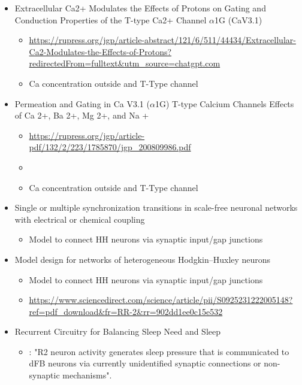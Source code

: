 \documentclass[../workflow.tex]{subfiles}
\begin{document}
\begin{itemize}
    \item Extracellular Ca2+ Modulates the Effects of Protons on Gating and Conduction Properties of the T-type Ca2+ Channel $\alpha$1G (CaV3.1)
    \begin{itemize}
        \item \url{https://rupress.org/jgp/article-abstract/121/6/511/44434/Extracellular-Ca2-Modulates-the-Effects-of-Protons?redirectedFrom=fulltext&utm_source=chatgpt.com}
        \item Ca concentration outside and T-Type channel
    \end{itemize}

    \item Permeation and Gating in Ca V3.1 ($\alpha$1G) T-type Calcium Channels Effects of Ca 2+, Ba 2+, Mg 2+, and Na +
    \begin{itemize}
        \item \url{https://rupress.org/jgp/article-pdf/132/2/223/1785870/jgp_200809986.pdf}
        \item \item Ca concentration outside and T-Type channel
    \end{itemize}

    \item Single or multiple synchronization transitions in scale-free neuronal networks with electrical or chemical coupling
    \begin{itemize}
        \item Model to connect HH neurons via synaptic input/gap junctions
    \end{itemize}

    \item Model design for networks of heterogeneous Hodgkin–Huxley neurons
    \begin{itemize}
        \item Model to connect HH neurons via synaptic input/gap junctions
        \item \url{https://www.sciencedirect.com/science/article/pii/S0925231222005148?ref=pdf_download&fr=RR-2&rr=902dd1ee0c15e532}
    \end{itemize}

    \item Recurrent Circuitry for Balancing Sleep Need and Sleep
    \begin{itemize}
        \item \parencite{donleaRecurrentCircuitryBalancing2018}: "R2 neuron activity generates sleep pressure that is communicated
        to dFB neurons via currently unidentified synaptic connections or non-synaptic mechanisms".
    \end{itemize}
    

\end{itemize}
\end{document}
